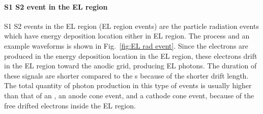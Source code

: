 \paragraph{S1 S2 event in the EL region}
\label{sec:events particle EL region}
\label{sec:EL region event}
S1 S2 events in the EL region (EL region events) are the particle radiation events which have energy deposition location either in EL region. The process and an example waveforms is shown in Fig.~\ref{fig:EL rad event}. Since the electrons are produced in the energy deposition location in the EL region, these electrons drift in the EL region toward the anodic grid, producing EL photons. The duration of these signals are shorter compared to the \ees s because of the shorter drift length. The total quantity of photon production in this type of events is usually higher than that of an \eee , an anode cone event, and a cathode cone event, because of the free drifted electrons inside the EL region.

